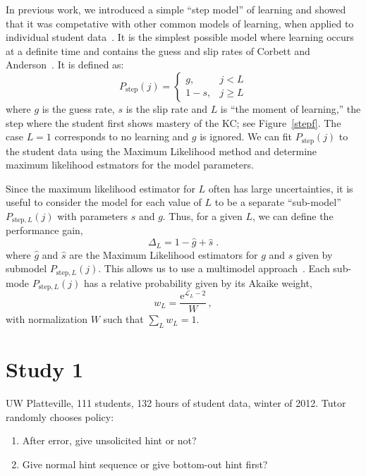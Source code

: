 \documentclass{edm_template}
\begin{document}
In previous work, we introduced a simple ``step model'' of learning
and showed that it was competative with other common models
of learning, when applied to individual student 
data~\cite{van_de_sande_applying_2013}.
It is the simplest possible model where learning occurs at
a definite time and contains the guess and slip rates of Corbett and 
Anderson~\cite{corbett_knowledge_1995}.  It is defined as:
%
\begin{equation}
               P_\mathrm{step}(j) = \left\{\begin{array}{cc}
                                       g,& j<L\\
				       1-s,& j\ge L
                                    \end{array}\right. \label{step}
\end{equation}
%
where $g$ is the guess rate, $s$ is the slip rate and 
$L$ is ``the moment of learning,'' the step where the student
first shows mastery of the KC; see Figure~\ref{stepf}.  The case $L=1$
corresponds to no learning and $g$ is ignored.
%
We can fit $P_\mathrm{step}(j)$ to the student data using the
Maximum Likelihood method and determine maximum likelihood estmators
for the model parameters.  

Since the maximum likelihood estimator for $L$ often has large
uncertainties, it is useful to consider the model for each value of $L$
to be a separate ``sub-model''  $P_{\mathrm{step},L}(j)$ with parameters
$s$ and $g$.
Thus, for a given $L$, we can define the performance gain,
%
\begin{equation}
         \Delta_L = 1- \hat{g}+\hat{s}\; .
\end{equation}
%
where $\hat{g}$ and $\hat{s}$ are the
Maximum Likelihood estimators for $g$ and $s$ given by submodel
$P_{\mathrm{step},L}(j)$.
This allows us to use a multimodel approach~\cite{burnham_model_2002}.
Each sub-mode $P_{\mathrm{step},L}(j)$ has a relative probability given 
by its Akaike weight,  
%
\begin{equation}
                   w_L = \frac{\mathrm{e}^{\mathcal{L}_L-2}}{W}\, ,
\end{equation}
%
with normalization $W$ such that $\sum_L w_L=1$.


\section{Study 1}

UW Platteville, 111 students, 132 hours of student data, winter of 2012.  
Tutor randomly chooses policy: 
\begin{enumerate} 
\item After error, give unsolicited hint or not?
\item Give normal hint sequence or give bottom-out hint first?  
\end{enumerate}
\end{document}
